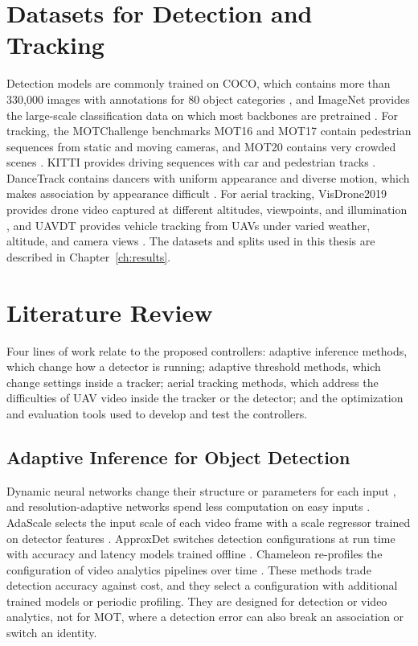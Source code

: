 \section{Datasets for Detection and Tracking}\label{sec:bg-datasets}
Detection models are commonly trained on COCO, which contains more than 330,000 images with annotations for 80 object categories \cite{lin2014coco}, and ImageNet provides the large-scale classification data on which most backbones are pretrained \cite{russakovsky2015imagenet}. For tracking, the MOTChallenge benchmarks MOT16 and MOT17 \cite{milan2016mot16,dendorfer2021motchallenge} contain pedestrian sequences from static and moving cameras, and MOT20 contains very crowded scenes \cite{dendorfer2020mot20}. KITTI provides driving sequences with car and pedestrian tracks \cite{geiger2012kitti}. DanceTrack contains dancers with uniform appearance and diverse motion, which makes association by appearance difficult \cite{sun2022dancetrack}. For aerial tracking, VisDrone2019 provides drone video captured at different altitudes, viewpoints, and illumination \cite{zhu2022visdrone}, and UAVDT provides vehicle tracking from UAVs under varied weather, altitude, and camera views \cite{du2018uavdt}. The datasets and splits used in this thesis are described in Chapter~\ref{ch:results}.

\section{Literature Review}\label{sec:bg-review}
Four lines of work relate to the proposed controllers: adaptive inference methods, which change how a detector is running; adaptive threshold methods, which change settings inside a tracker; aerial tracking methods, which address the difficulties of UAV video inside the tracker or the detector; and the optimization and evaluation tools used to develop and test the controllers.

\subsection{Adaptive Inference for Object Detection}
Dynamic neural networks change their structure or parameters for each input \cite{han2022dynamic}, and resolution-adaptive networks spend less computation on easy inputs \cite{yang2020ranet}. AdaScale selects the input scale of each video frame with a scale regressor trained on detector features \cite{chin2019adascale}. ApproxDet switches detection configurations at run time with accuracy and latency models trained offline \cite{xu2020approxdet}. Chameleon re-profiles the configuration of video analytics pipelines over time \cite{jiang2018chameleon}. These methods trade detection accuracy against cost, and they select a configuration with additional trained models or periodic profiling. They are designed for detection or video analytics, not for MOT, where a detection error can also break an association or switch an identity.

